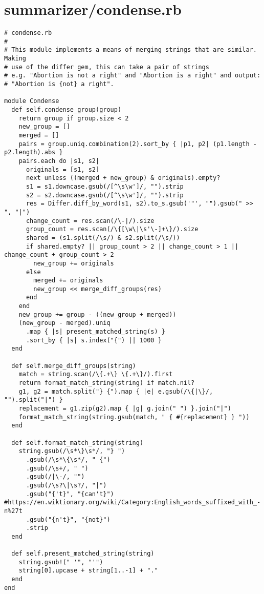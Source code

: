 \documentclass{article}
\begin{document}
\section*{summarizer/condense.rb}
\begin{verbatim}
# condense.rb
#
# This module implements a means of merging strings that are similar. Making
# use of the differ gem, this can take a pair of strings
# e.g. "Abortion is not a right" and "Abortion is a right" and output:
# "Abortion is {not} a right".

module Condense
  def self.condense_group(group)
    return group if group.size < 2
    new_group = []
    merged = []
    pairs = group.uniq.combination(2).sort_by { |p1, p2| (p1.length - p2.length).abs }
    pairs.each do |s1, s2|
      originals = [s1, s2]
      next unless ((merged + new_group) & originals).empty?
      s1 = s1.downcase.gsub(/[^\s\w']/, "").strip
      s2 = s2.downcase.gsub(/[^\s\w']/, "").strip
      res = Differ.diff_by_word(s1, s2).to_s.gsub('"', "").gsub(" >> ", "|")
      change_count = res.scan(/\-|/).size
      group_count = res.scan(/\{[\w\|\s'\-]+\}/).size
      shared = (s1.split(/\s/) & s2.split(/\s/))
      if shared.empty? || group_count > 2 || change_count > 1 || change_count + group_count > 2
        new_group += originals
      else
        merged += originals
        new_group << merge_diff_groups(res)
      end
    end
    new_group += group - ((new_group + merged))
    (new_group - merged).uniq
      .map { |s| present_matched_string(s) }
      .sort_by { |s| s.index("{") || 1000 }
  end

  def self.merge_diff_groups(string)
    match = string.scan(/\{.+\} \{.+\}/).first
    return format_match_string(string) if match.nil?
    g1, g2 = match.split("} {").map { |e| e.gsub(/\{|\}/, "").split("|") }
    replacement = g1.zip(g2).map { |g| g.join(" ") }.join("|")
    format_match_string(string.gsub(match, " { #{replacement} } "))
  end

  def self.format_match_string(string)
    string.gsub(/\s*\}\s*/, "} ")
      .gsub(/\s*\{\s*/, " {")
      .gsub(/\s+/, " ")
      .gsub(/|\-/, "")
      .gsub(/\s?\|\s?/, "|")
      .gsub("{'t}", "{can't}") #https://en.wiktionary.org/wiki/Category:English_words_suffixed_with_-n%27t
      .gsub("{n't}", "{not}")
      .strip
  end

  def self.present_matched_string(string)
    string.gsub!(" '", "'")
    string[0].upcase + string[1..-1] + "."
  end
end


\end{verbatim}
\pagebreak
\end{document}
